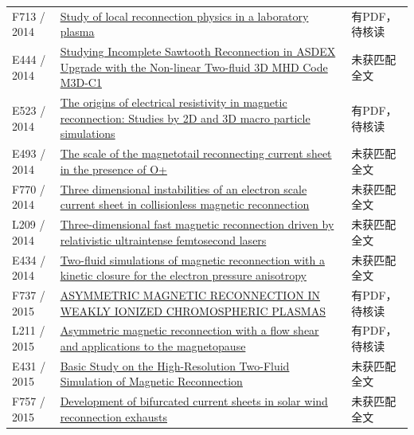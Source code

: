 \begin{longtable}{P{24mm}P{97mm}P{27mm}}
F713 / 2014 & \href{https://doi.org/10.1186/bf03353267}{Study of local reconnection physics in a laboratory plasma} & 有PDF，待核读\\

E444 / 2014 & \href{http://citeseerx.ist.psu.edu/viewdoc/summary?doi=10.1.1.717.5563}{Studying Incomplete Sawtooth Reconnection in ASDEX Upgrade with the Non-linear Two-fluid 3D MHD Code M3D-C1} & 未获匹配全文\\

E523 / 2014 & \href{https://doi.org/10.1186/bf03353257}{The origins of electrical resistivity in magnetic reconnection: Studies by 2D and 3D macro particle simulations} & 有PDF，待核读\\

E493 / 2014 & \href{https://doi.org/10.1002/2014gl060440}{The scale of the magnetotail reconnecting current sheet in the presence of O+} & 未获匹配全文\\

F770 / 2014 & \href{https://doi.org/10.1063/1.4885636}{Three dimensional instabilities of an electron scale current sheet in collisionless magnetic reconnection} & 未获匹配全文\\

L209 / 2014 & \href{https://doi.org/10.1103/physreve.89.031101}{Three-dimensional fast magnetic reconnection driven by relativistic ultraintense femtosecond lasers} & 未获匹配全文\\

E434 / 2014 & \href{http://hdl.handle.net/1721.1/95854}{Two-fluid simulations of magnetic reconnection with a kinetic closure for the electron pressure anisotropy} & 未获匹配全文\\

F737 / 2015 & \href{https://doi.org/10.1088/0004-637x/805/2/134}{ASYMMETRIC MAGNETIC RECONNECTION IN WEAKLY IONIZED CHROMOSPHERIC PLASMAS} & 有PDF，待核读\\

L211 / 2015 & \href{https://doi.org/10.1002/2015ja021489}{Asymmetric magnetic reconnection with a flow shear and applications to the magnetopause} & 有PDF，待核读\\

E431 / 2015 & \href{https://nifs-repository.repo.nii.ac.jp/records/7192}{Basic Study on the High-Resolution Two-Fluid Simulation of Magnetic Reconnection} & 未获匹配全文\\

F757 / 2015 & \href{https://doi.org/10.1002/2015gl066820}{Development of bifurcated current sheets in solar wind reconnection exhausts} & 未获匹配全文\\


\end{longtable}
